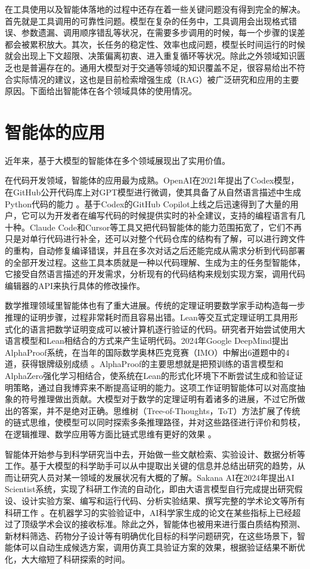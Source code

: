 在工具使用以及智能体落地的过程中还存在着一些关键问题没有得到完全的解决。首先就是工具调用的可靠性问题。模型在复杂的任务中，工具调用会出现格式错误、参数遗漏、调用顺序错乱等状况，在需要多步调用的时候，每一个步骤的误差都会被累积放大。其次，长任务的稳定性、效率也成问题，模型长时间运行的时候就会出现上下文超限、决策偏离初衷、进入重复循环等状况。除此之外领域知识匮乏也是普遍存在的。通用大模型对于交通等领域的知识覆盖不足，很容易给出不符合实际情况的建议，这也是目前检索增强生成（RAG）被广泛研究和应用的主要原因。下面给出智能体在各个领域具体的使用情况。

\section{智能体的应用}

近年来，基于大模型的智能体在多个领域展现出了实用价值。

在代码开发领域，智能体的应用最为成熟。OpenAI在2021年提出了Codex模型，在GitHub公开代码库上对GPT模型进行微调，使其具备了从自然语言描述中生成Python代码的能力 。基于Codex的GitHub Copilot上线之后迅速得到了大量的用户，它可以为开发者在编写代码的时候提供实时的补全建议，支持的编程语言有几十种。Claude Code和Cursor等工具又把代码智能体的能力范围拓宽了，它们不再只是对单行代码进行补全，还可以对整个代码仓库的结构有了解，可以进行跨文件的重构，自动修复编译错误，并且在多次对话之后还能完成从需求分析到代码部署的全部开发过程。这些工具本质就是一种以代码理解、生成为主的任务型智能体，它接受自然语言描述的开发需求，分析现有的代码结构来规划实现方案，调用代码编辑器的API来执行具体的修改操作。

数学推理领域里智能体也有了重大进展。传统的定理证明要数学家手动构造每一步推理的证明步骤，过程非常耗时而且容易出错。Lean等交互式定理证明工具用形式化的语言把数学证明变成可以被计算机逐行验证的代码。研究者开始尝试使用大语言模型和Lean相结合的方式来产生证明代码。2024年Google DeepMind提出AlphaProof系统，在当年的国际数学奥林匹克竞赛（IMO）中解出6道题中的4道，获得银牌级别成绩 。AlphaProof的主要思想就是把预训练的语言模型和AlphaZero强化学习相结合，使系统在Lean的形式化环境下不断尝试生成和验证证明策略，通过自我博弈来不断提高证明的能力。这项工作证明智能体可以对高度抽象的符号推理做出贡献。大模型对于数学的定理证明有着诸多的进展，不过它所做出的答案，并不是绝对正确。思维树（Tree-of-Thoughts，ToT）方法扩展了传统的链式思维，使模型可以同时探索多条推理路径，并对这些路径进行评价和剪枝，在逻辑推理、数学应用等方面比链式思维有更好的效果 。

智能体开始参与到科学研究当中去，开始做一些文献检索、实验设计、数据分析等工作。基于大模型的科学助手可以从中提取出关键的信息并总结出研究的趋势，从而让研究人员对某一领域的发展状况有大概的了解。Sakana AI在2024年提出AI Scientist系统，实现了科研工作流的自动化，即由大语言模型自行完成提出研究假设、设计实验方案、编写和运行代码、分析实验结果、撰写完整的学术论文等所有科研工作 。在机器学习的实验验证中，AI科学家生成的论文在某些指标上已经超过了顶级学术会议的接收标准。除此之外，智能体也被用来进行蛋白质结构预测、新材料筛选、药物分子设计等有明确优化目标的科学问题研究，在这些场景下，智能体可以自动生成候选方案，调用仿真工具验证方案的效果，根据验证结果不断优化，大大缩短了科研探索的时间。

